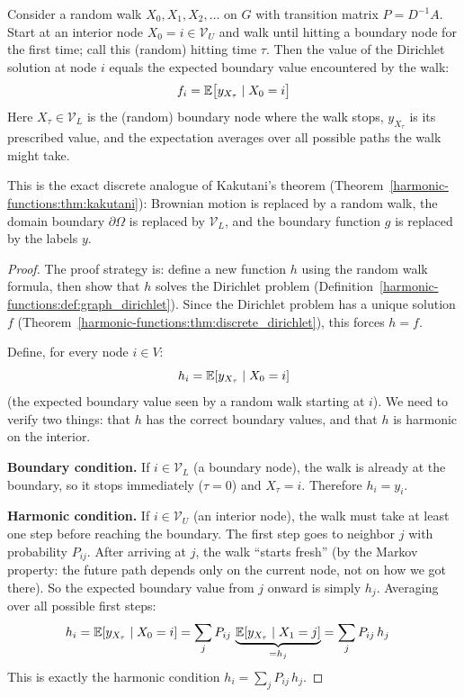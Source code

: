 \begin{notechapter}
\begin{theorem}
\label{harmonic-functions:thm:rw_label_prop}
Consider a random walk $X_0, X_1, X_2, \ldots$ on $G$ with transition
matrix $P = D^{-1}A$. Start at an interior node $X_0 = i \in \mathcal{V}_U$
and walk until hitting a boundary node for the first time; call this
(random) hitting time $\tau$. Then the value of the Dirichlet solution at
node $i$ equals the expected boundary value encountered by the walk:
\begin{equation}
f_i = \mathbb{E}\bigl[y_{X_\tau} \mid X_0 = i\bigr]
\end{equation}
Here $X_\tau \in \mathcal{V}_L$ is the (random) boundary node where the
walk stops, $y_{X_\tau}$ is its prescribed value, and the expectation
averages over all possible paths the walk might take.
\end{theorem}

This is the exact discrete analogue of Kakutani's theorem
(Theorem~\ref{harmonic-functions:thm:kakutani}): Brownian motion is replaced by a random walk,
the domain boundary $\partial\Omega$ is replaced by $\mathcal{V}_L$, and the
boundary function $g$ is replaced by the labels $y$.

\begin{proof}
The proof strategy is: define a new function $h$ using the random walk
formula, then show that $h$ solves the Dirichlet problem
(Definition~\ref{harmonic-functions:def:graph_dirichlet}). Since the Dirichlet problem has a
unique solution $f$ (Theorem~\ref{harmonic-functions:thm:discrete_dirichlet}), this forces
$h = f$.

Define, for every node $i \in V$:
\[
h_i = \mathbb{E}[y_{X_\tau} \mid X_0 = i]
\]
(the expected boundary value seen by a random walk starting at $i$). We
need to verify two things: that $h$ has the correct boundary values, and
that $h$ is harmonic on the interior.

\textbf{Boundary condition.} If $i \in \mathcal{V}_L$ (a boundary node),
the walk is already at the boundary, so it stops immediately ($\tau = 0$)
and $X_\tau = i$. Therefore $h_i = y_i$. \checkmark

\textbf{Harmonic condition.} If $i \in \mathcal{V}_U$ (an interior node),
the walk must take at least one step before reaching the boundary. The
first step goes to neighbor $j$ with probability $P_{ij}$. After arriving
at $j$, the walk ``starts fresh'' (by the Markov property: the future path
depends only on the current node, not on how we got there). So the expected
boundary value from $j$ onward is simply $h_j$. Averaging over all possible
first steps:
\begin{align}
h_i &= \mathbb{E}[y_{X_\tau} \mid X_0 = i]
= \sum_j P_{ij}\,\underbrace{\mathbb{E}[y_{X_\tau} \mid X_1 = j]}_{= h_j}
= \sum_j P_{ij}\,h_j
\end{align}
This is exactly the harmonic condition
$h_i = \sum_j P_{ij}\,h_j$. \checkmark


\end{proof}
\end{notechapter}
